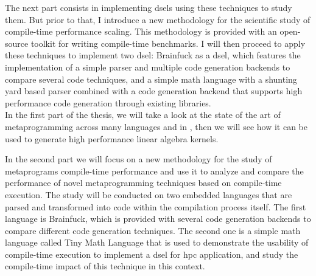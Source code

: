 \documentclass[main]{subfiles}
\begin{document}
The next part consists in implementing \glspl{dsel} using these techniques
to study them. But prior to that, I introduce a new methodology
for the scientific study of compile-time performance scaling.
This methodology is provided with an open-source toolkit for writing
\cpp compile-time benchmarks. I will then proceed to apply these
techniques to implement two \gls{dsel}:
Brainfuck as a \gls{dsel}, which features the implementation of a simple parser
and multiple code generation backends to compare several code techniques,
and a simple math language with a shunting yard based parser combined with
a code generation backend that supports high performance code generation
through existing \cpp libraries.
\\




In the first part of the thesis, we will take a look at the state of the art of
metaprogramming across many languages and in \cpp,
then we will see how it can be used to generate high performance linear algebra
kernels.

In the second part we will focus on a new methodology for the study of \cpp
metaprograms compile-time performance and use it to analyze and compare the
performance of novel \cpp metaprogramming techniques based on compile-time \cpp
execution. The study will be conducted on two embedded languages that are parsed
and transformed into \cpp code within the \cpp compilation process itself.
The first language is Brainfuck, which is provided with several code generation
backends to compare different code generation techniques. The second one
is a simple math language called Tiny Math Language that is used to demonstrate
the usability of compile-time \cpp execution to implement a \gls{dsel} for
\acrlong{hpc} application, and study the compile-time impact of this technique
in this context.
\end{document}
